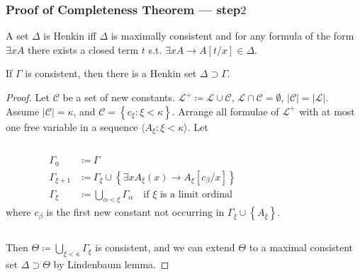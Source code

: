 \documentclass[UTF8,aspectratio=43,11pt,colorlinks,compress,openany]{beamer}%
\begin{document}
\begin{frame}\frametitle{Proof of Completeness Theorem --- step$2$}\vspace{-1pt}
	A set $\Delta$ is Henkin iff $\Delta$ is maximally consistent and for any formula of the form $\exists x A$ there exists a closed term $t$ s.t. $\exists x A\to A[t/x]\in\Delta$.\vspace{-1pt}
	\begin{lemma}
		If $\Gamma$ is consistent, then there is a Henkin set $\Delta\supset\Gamma$.
	\end{lemma}\vspace{-1pt}
	\begin{proof}
		Let $\mathcal{C}$ be a set of new constants. $\mathscr{L}^+\coloneqq \mathscr{L}\cup\mathcal{C}$, $\mathscr{L}\cap\mathcal{C}=\emptyset$, $|\mathcal{C}|=|\mathscr{L}|$.\\
		Assume $|\mathcal{C}|=\kappa$, and $\mathcal{C}=\left\{c_\xi: \xi<\kappa\right\}$. Arrange all formulae of $\mathscr{L}^+$ with at most one free variable in a sequence $\langle A_\xi: \xi<\kappa\rangle$. Let\vspace{-10pt}
		\begin{columns}
				\begin{align*}
				\Gamma_0&\coloneqq \Gamma\\
				\Gamma_{\xi+1}&\coloneqq \Gamma_{\xi}\cup\left\{\exists x A_\xi(x)\to A_\xi[c_\beta/x]\right\}\\
				\Gamma_\xi&\coloneqq \bigcup\limits_{\alpha<\xi}\Gamma_\alpha\quad\text{if $\xi$ is a limit ordinal}
				\end{align*}
				where $c_\beta$ is the first new constant not occurring in $\Gamma_\xi\cup\left\{A_\xi\right\}$.
		\end{columns}
		Then $\Theta\coloneqq \bigcup\limits_{\xi<\kappa}\Gamma_\xi$ is consistent, and we can extend $\Theta$ to a maximal consistent set $\Delta\supset\Theta$ by Lindenbaum lemma.
	\end{proof}
\end{frame}
\end{document}
